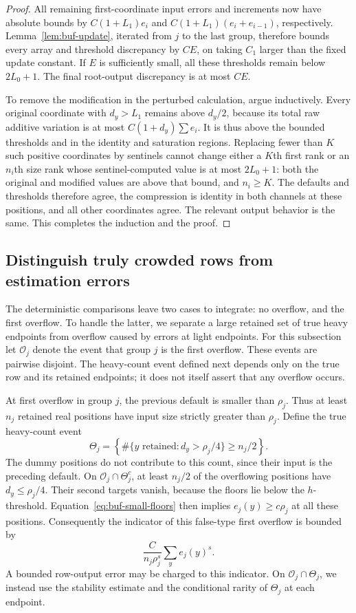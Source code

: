 \begin{proof}
All remaining first-coordinate input errors and increments now have
absolute bounds by $C(1+L_1)e_i$ and
$C(1+L_1)(e_i+e_{i-1})$, respectively.  Lemma~\ref{lem:buf-update},
iterated from $j$ to the last group, therefore bounds every array and
threshold discrepancy by $CE$, on taking $C_1$ larger than the fixed
update constant.  If $E$ is sufficiently small, all these thresholds
remain below $2L_0+1$.  The final root-output discrepancy is at most $CE$.

To remove the modification in the perturbed calculation, argue inductively.
Every original coordinate with $d_y>L_1$ remains above $d_y/2$, because
its total raw additive variation is at most $C(1+d_y)\sum e_i$.
It is thus above the bounded thresholds and in the identity and saturation
regions.  Replacing fewer than $K$ such positive coordinates by sentinels
cannot change either a $K$th first rank or an $n_i$th size rank whose
sentinel-computed value is at most $2L_0+1$: both the original and modified
values are above that bound, and $n_i\geq K$.
The defaults and thresholds therefore agree, the compression is identity
in both channels at these positions, and all other coordinates agree.
The relevant output behavior is the same.  This completes the induction
and the proof.
\end{proof}

\subsection{Distinguish truly crowded rows from estimation errors}

The deterministic comparisons leave two cases to integrate: no overflow,
and the first overflow.  To handle the latter, we separate a large retained
set of true heavy endpoints from overflow caused by errors at light
endpoints.
For this subsection let $\mathcal O_j$ denote the event that group $j$
is the first overflow.  These events are pairwise disjoint.  The
heavy-count event defined next depends only on the true row and its
retained endpoints; it does not itself assert that any overflow occurs.

At first overflow in group $j$, the previous default is smaller than
$\rho_j$.  Thus at least $n_j$ retained real positions have input size
strictly greater than $\rho_j$.  Define the true heavy-count event
\[
 \Theta_j=\left\{\#\{y\text{ retained}:d_y>\rho_j/4\}\geq n_j/2\right\}.
\]
The dummy positions do not contribute to this count, since their input
is the preceding default.  On $\mathcal O_j\cap\Theta_j^c$, at least
$n_j/2$ of the overflowing positions have
$d_y\leq\rho_j/4$.  Their second targets vanish, because the floors lie
below the $h$-threshold.  Equation~\eqref{eq:buf-small-floors} then implies
$e_j(y)\geq c\rho_j$ at all these positions.  Consequently the indicator
of this false-type first overflow is bounded by
\begin{equation}
 \frac{C}{n_j\rho_j^s}\sum_y e_j(y)^s.
 \label{eq:buf-false-charge}
\end{equation}
A bounded row-output error may be charged to this indicator.
On $\mathcal O_j\cap\Theta_j$, we instead use the stability estimate
and the conditional rarity of $\Theta_j$ at each endpoint.

